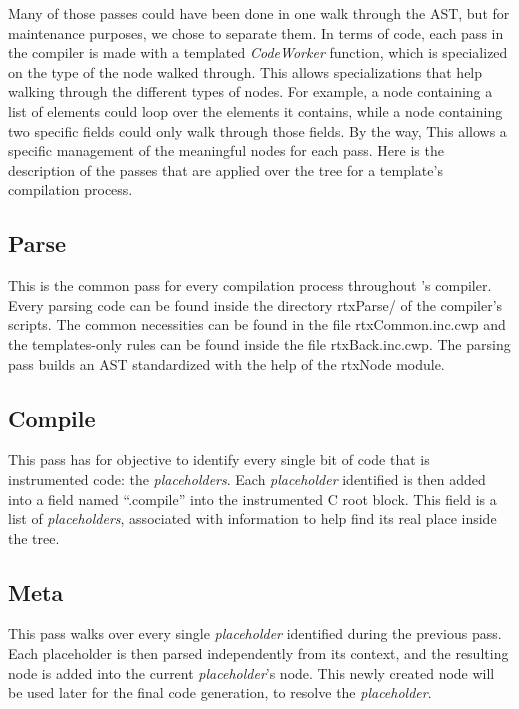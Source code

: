 \documentclass[american]{rtxreport}
\begin{document}
Many of those passes could have been done in one walk through the AST, but for
maintenance purposes, we chose to separate them. In terms of code, each pass in
the compiler is made with a templated \emph{CodeWorker} function, which is
specialized on the type of the node walked through. This allows specializations
that help walking through the different types of nodes. For example, a node
containing a list of elements could loop over the elements it contains, while a
node containing two specific fields could only walk through those fields. By
the way, This allows a specific management of the meaningful nodes for each
pass. Here is the description of the passes that are applied over the tree for
a template's compilation process.

\subsection{Parse}

This is the common pass for every compilation process throughout \rtx's
compiler. Every parsing code can be found inside the directory rtxParse/ of the
compiler's scripts. The common necessities can be found in the file
rtxCommon.inc.cwp and the templates-only rules can be found inside the file
rtxBack.inc.cwp. The parsing pass builds an AST standardized with the help of
the rtxNode module.

\subsection{Compile}

This pass has for objective to identify every single bit of code that is
instrumented code: the \emph{placeholders}. Each \emph{placeholder}
identified is then added into a field named ``.compile'' into the
instrumented C root block. This field is a list of \emph{placeholders},
associated with information to help find its real place inside the tree.

\subsection{Meta}

This pass walks over every single \emph{placeholder} identified during the
previous pass. Each placeholder is then parsed independently from its context,
and the resulting node is added into the current \emph{placeholder}'s node.
This newly created node will be used later for the final code generation, to
resolve the \emph{placeholder}.
\end{document}

